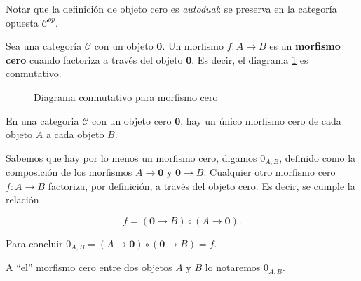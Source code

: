 Notar que la definición de objeto cero es \textit{autodual}: se preserva en la categoría opuesta $\mathscr{C}^{op}$.

\begin{definicion}
    Sea una categoría $\mathscr{C}$ con un objeto $\boldsymbol{0}$. Un morfismo $f: A \longrightarrow B$ es un \textbf{morfismo cero} cuando factoriza a través del objeto $\boldsymbol{0}$. Es decir, el diagrama \ref{diag:zero-morphism} es conmutativo. 
\end{definicion}

\begin{figure}[h!]
    \centering
    \caption{Diagrama conmutativo para morfismo cero}
    \label{diag:zero-morphism}
\end{figure}


\begin{proposicion} \label{unicidad-morfismo-cero}
    En una categoria $\mathscr{C}$ con un objeto cero $\boldsymbol{0}$, hay un único morfismo cero de cada objeto $A$ a cada objeto $B$.
\end{proposicion}
Sabemos que hay por lo menos un morfismo cero, digamos $0_{A,B}$, definido como la composición de los morfismos $A \longrightarrow \boldsymbol{0}$ y $\boldsymbol{0} \longrightarrow B$. Cualquier otro morfismo cero $f: A \longrightarrow B$ factoriza, por definición, a través del objeto cero. Es decir, se cumple la relación 

$$
    f = (\boldsymbol{0} \longrightarrow B) \circ (A \longrightarrow \boldsymbol{0}) \text{.}
$$

Para concluir $0_{A,B} = (A \longrightarrow \boldsymbol{0}) \circ (\boldsymbol{0} \longrightarrow B) = f$.

\begin{observacion}
    A ``el'' morfismo cero entre dos objetos $A$ y $B$ lo notaremos $0_{A,B}$.
\end{observacion}

